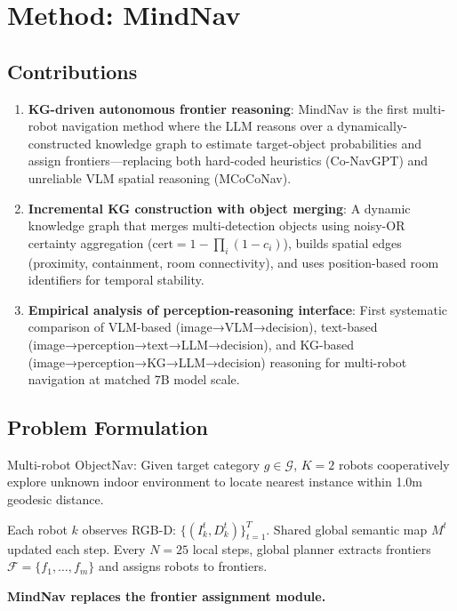 \section{Method: MindNav}

\subsection{Contributions}

\begin{enumerate}
    \item \textbf{KG-driven autonomous frontier reasoning}: MindNav is the first multi-robot navigation method where the LLM reasons over a dynamically-constructed knowledge graph to estimate target-object probabilities and assign frontiers---replacing both hard-coded heuristics (Co-NavGPT) and unreliable VLM spatial reasoning (MCoCoNav).

    \item \textbf{Incremental KG construction with object merging}: A dynamic knowledge graph that merges multi-detection objects using noisy-OR certainty aggregation ($\text{cert} = 1 - \prod_i(1-c_i)$), builds spatial edges (proximity, containment, room connectivity), and uses position-based room identifiers for temporal stability.

    \item \textbf{Empirical analysis of perception-reasoning interface}: First systematic comparison of VLM-based (image→VLM→decision), text-based (image→perception→text→LLM→decision), and KG-based (image→perception→KG→LLM→decision) reasoning for multi-robot navigation at matched 7B model scale.
\end{enumerate}

\subsection{Problem Formulation}

Multi-robot ObjectNav: Given target category $g \in \mathcal{G}$, $K=2$ robots cooperatively explore unknown indoor environment to locate nearest instance within 1.0m geodesic distance.

Each robot $k$ observes RGB-D: $\{(I_k^t, D_k^t)\}_{t=1}^T$. Shared global semantic map $M^t$ updated each step. Every $N=25$ local steps, global planner extracts frontiers $\mathcal{F} = \{f_1, \ldots, f_m\}$ and assigns robots to frontiers.

\textbf{MindNav replaces the frontier assignment module.}

